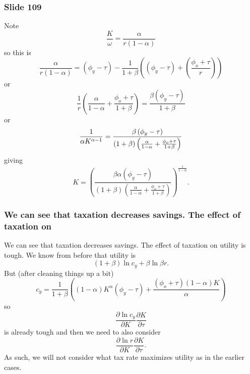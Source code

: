 \documentclass[aspectratio=169]{ltx-talk}
\begin{document}
\begin{frame}
\frametitle{Slide 109}
Note 
\begin{equation*}
\frac{K}{\omega }=\frac{\alpha }{r\left( 1-\alpha \right) }
\end{equation*}%
so this is 
\begin{equation*}
\frac{\alpha }{r\left( 1-\alpha \right) }=\left( \phi _{y}-\tau \right) -%
\frac{1}{1+\beta }\left( \left( \phi _{y}-\tau \right) +\left( \frac{\phi
_{o}+\tau }{r}\right) \right)
\end{equation*}%
or%
\begin{equation*}
\frac{1}{r}\left( \frac{\alpha }{1-\alpha }+\frac{\phi _{o}+\tau }{1+\beta }%
\right) =\frac{\beta \left( \phi _{y}-\tau \right) }{1+\beta }
\end{equation*}%
or%
\begin{equation*}
\frac{1}{\alpha K^{\alpha -1}}=\frac{\beta \left( \phi _{y}-\tau \right) }{%
\left( 1+\beta \right) \left( \frac{\alpha }{1-\alpha }+\frac{\phi _{o}+\tau 
}{1+\beta }\right) }
\end{equation*}%
giving 
\begin{equation*}
K=\left( \frac{\beta \alpha \left( \phi _{y}-\tau \right) }{\left( 1+\beta
\right) \left( \frac{\alpha }{1-\alpha }+\frac{\phi _{o}+\tau }{1+\beta }%
\right) }\right) ^{\frac{1}{1-\alpha }}.
\end{equation*}
\end{frame}

\begin{frame}
\frametitle{We can see that taxation decreases savings. The effect of taxation on}
We can see that taxation decreases savings. The effect of taxation on
utility is tough. We know from before that utility is 
\begin{equation*}
\left( 1+\beta \right) \ln c_{y}+\beta \ln \beta r.
\end{equation*}%
But (after cleaning things up a bit)%
\begin{equation*}
c_{y}=\frac{1}{1+\beta }\left( \left( 1-\alpha \right) K^{\alpha }\left(
\phi _{y}-\tau \right) +\frac{\left( \phi _{o}+\tau \right) \left( 1-\alpha
\right) K}{\alpha }\right)
\end{equation*}%
so 
\begin{equation*}
\frac{\partial \ln c_{y}}{\partial K}\frac{\partial K}{\partial \tau }
\end{equation*}%
is already tough and then we need to also consider 
\begin{equation*}
\frac{\partial \ln r}{\partial K}\frac{\partial K}{\partial \tau }.
\end{equation*}%
As such, we will not consider what tax rate maximizes utility as in the
earlier cases.
\end{frame}
\end{document}
